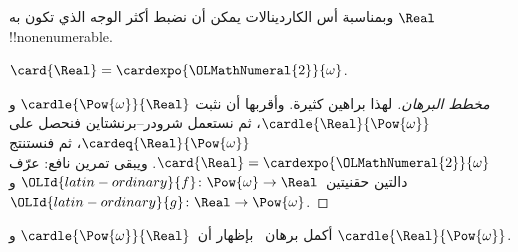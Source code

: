 \documentclass[../../../include/open-logic-section]{subfiles}
\begin{document}
وبمناسبة أس الكاردينالات يمكن أن نضبط أكثر الوجه الذي تكون به
$\Real$ !!{nonenumerable}.

\begin{thm}
$\card{\Real} = \cardexpo{{\OLMathNumeral{2}}}{\omega}$.
\end{thm}

\begin{proof}[مخطط البرهان]
لهذا براهين كثيرة. وأقربها أن نثبت
$\cardle{\Pow{\omega}}{\Real}$ و$\cardle{\Real}{\Pow{\omega}}$، ثم
نستعمل شرودر--برنشتاين فنحصل على
$\cardeq{\Real}{\Pow{\omega}}$، ثم
 فنستنتج
$\card{\Real} = \cardexpo{{\OLMathNumeral{2}}}{\omega}$. ويبقى تمرين نافع: عرّف
دالتين حقنيتين~${\OLId{latin-ordinary}{f}} \colon \Pow{\omega} \to \Real$ و
${\OLId{latin-ordinary}{g}} \colon \Real \to \Pow{\omega}$.
\end{proof}

\begin{prob}
أكمل برهان~ بإظهار
أن~$\cardle{\Pow{\omega}}{\Real}$ و
$\cardle{\Real}{\Pow{\omega}}$.
\end{prob}
\end{document}
